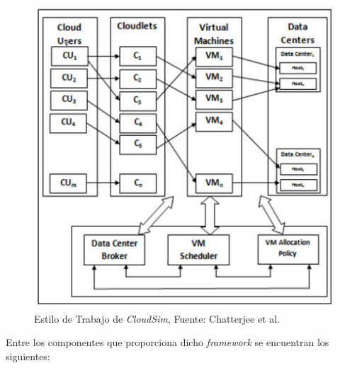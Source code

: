 \setcounter{figure}{2}
\renewcommand\thefigure{\arabic{figure}}
\begin{figure}[h!]
	\centering
	\includegraphics[scale=0.5]{media/imagenuno}
	\caption{Estilo de Trabajo de \textit{CloudSim}, Fuente: Chatterjee et al.}
	\label{fig:TrabajoCloudsim}	
\end{figure}


Entre los componentes que proporciona dicho \textit{framework} se encuentran los siguientes:

